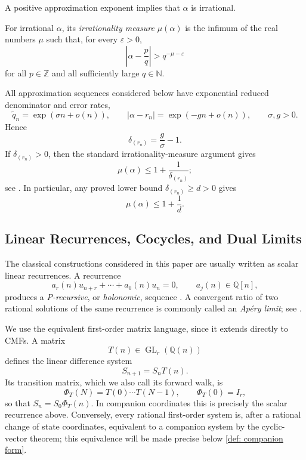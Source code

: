 \documentclass[oneside,english,11pt]{amsart}
\begin{document}
A positive approximation exponent implies that $\alpha$ is irrational.

\begin{defn}
\label{def:irrationality-measure}
For irrational $\alpha$, its \emph{irrationality measure}
$\mu(\alpha)$ is the infimum of the real numbers $\mu$ such that, for
every $\varepsilon>0$,
\[
    \left|\alpha-\frac pq\right|>q^{-\mu-\varepsilon}
\]
for all $p\in\mathbb Z$ and all sufficiently large $q\in\mathbb N$.
\end{defn}

\begin{remark}
\label{rem:mu-from-delta}
All approximation sequences considered below have exponential reduced
denominator and error rates,
\[
    \widetilde q_n=\exp(\sigma n+o(n)),
    \qquad
    |\alpha-r_n|=\exp(-g n+o(n)),
    \qquad \sigma,g>0.
\]
Hence
\[
    \delta_{(r_n)}=\frac{g}{\sigma}-1.
\]
If $\delta_{(r_n)}>0$, then the standard irrationality-measure argument
gives
\[
    \mu(\alpha)\le 1+\frac{1}{\delta_{(r_n)}};
\]
see \cite[\S2, p.~196]{van1979proof}.  In particular, any proved lower
bound $\delta_{(r_n)}\ge d>0$ gives
\[
    \mu(\alpha)\le 1+\frac1d.
\]
\end{remark}


\subsection{Linear Recurrences, Cocycles, and Dual Limits}
\label{subsec:linear-cocycles}

The classical constructions considered in this paper are usually
written as scalar linear recurrences.  A recurrence
\[
    a_r(n)u_{n+r}+\cdots+a_0(n)u_n=0,
    \qquad a_j(n)\in\mathbb Q[n],
\]
produces a \emph{P-recursive}, or \emph{holonomic}, sequence
\cite{stanley1980differentiably,lipshitz1989d,
zeilberger1990holonomic}.  A convergent ratio of two rational solutions
of the same recurrence is commonly called an \emph{Ap\'ery limit}; see
\cite[\S\S2.2--2.3]{weinbaum2025conservative}.

We use the equivalent first-order matrix language, since it extends
directly to CMFs.  A matrix
\[
    T(n)\in\operatorname{GL}_r(\mathbb Q(n))
\]
defines the linear difference system
\[
    S_{n+1}=S_nT(n).
\]
Its transition matrix, which we also call its forward walk, is
\[
    \Phi_T(N)=T(0)\cdots T(N-1),
    \qquad \Phi_T(0)=I_r,
\]
so that $S_n=S_0\Phi_T(n)$.  In companion coordinates this is precisely
the scalar recurrence above.  Conversely, every rational first-order
system is, after a rational change of state coordinates, equivalent to
a companion system by the cyclic-vector theorem; this equivalence will be
made precise below \ref{def: companion form}.
\end{document}
